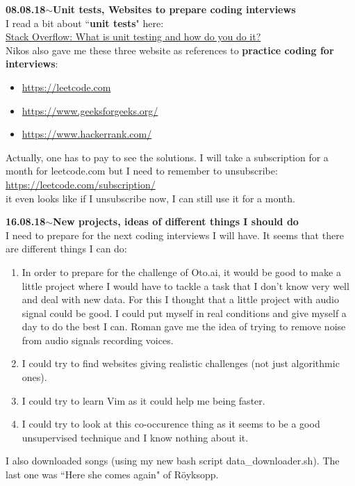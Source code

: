 \documentclass[11pt,a4paper]{article}
\newenvironment{loggentry}[2]%
{\noindent\textbf{#1}\hspace{1cm}$\mathbf{\sim}$\text{ }\textbf{#2}\\}{\vspace{0.5cm}}
\begin{document}
\begin{loggentry}{08.08.18}{Unit tests, Websites to prepare coding interviews}
I read a bit about ``\textbf{unit tests}" here:\\
\href{https://stackoverflow.com/questions/652292/what-is-unit-testing-and-how-do-you-do-it#652382}{Stack Overflow: What is unit testing and how do you do it?}\\

Nikos also gave me these three website as references to \textbf{practice coding for interviews}:\\
\begin{itemize}
\item \url{https://leetcode.com}
\item \url{https://www.geeksforgeeks.org/}
\item \url{https://www.hackerrank.com/}
\end{itemize}

Actually, one has to pay to see the solutions. I will take a subscription for a month for leetcode.com but I need to remember to unsubscribe:\\
\url{https://leetcode.com/subscription/}\\
it even looks like if I unsubscribe now, I can still use it for a month.\\

\end{loggentry}

\begin{loggentry}{16.08.18}{New projects, ideas of different things I should do}
I need to prepare for the next coding interviews I will have. It seems that there are different things I can do:\\
\begin{enumerate}
\item In order to prepare for the challenge of Oto.ai, it would be good to make a little project where I would have to tackle a task that I don't know very well and deal with new data. For this I thought that a little project with audio signal could be good. I could put myself in real conditions and give myself a day to do the best I can. Roman gave me the idea of trying to remove noise from audio signals recording voices.
\item I could try to find websites giving realistic challenges (not just algorithmic ones).
\item I could try to learn Vim as it could help me being faster.
\item I could try to look at this co-occurence thing as it seems to be a good unsupervised technique and I know nothing about it.
\end{enumerate}

I also downloaded songs (using my new bash script data\_downloader.sh). The last one was ``Here she comes again" of Röyksopp.
\end{loggentry}
\end{document}
